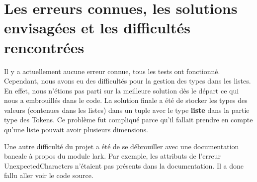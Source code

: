\section{Les erreurs connues, les solutions envisagées et les difficultés rencontrées}
Il y a actuellement aucune erreur connue, tous les tests ont fonctionné. Cependant, nous avons eu des difficultés pour la gestion des types dans les listes.
En effet, nous n'étions pas parti sur la meilleure solution dès le départ ce qui nous a embrouillés dans le code.
La solution finale a été de stocker les types des valeurs (contenues dans les listes) dans un tuple avec le type \textbf{liste} dans la partie type des Tokens.
Ce problème fut compliqué parce qu'il fallait prendre en compte qu'une liste pouvait avoir plusieurs dimensions.

Une autre difficulté du projet a été de se débrouiller avec une documentation bancale à propos du module lark.%
Par exemple, les attributs de l'erreur UnexpectedCharacters n'étaient pas présents dans la documentation. Il a donc fallu aller voir le code source.
